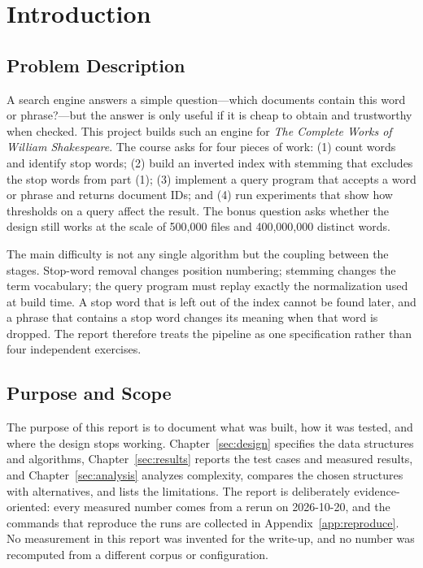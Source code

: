 
\section{Introduction}
\label{sec:intro}

\subsection{Problem Description}

A search engine answers a simple question---which documents contain this word
or phrase?---but the answer is only useful if it is cheap to obtain and
trustworthy when checked. This project builds such an engine for \emph{The
Complete Works of William Shakespeare}. The course asks for four pieces of
work: (1) count words and identify stop words; (2) build an inverted index with
stemming that excludes the stop words from part (1); (3) implement a query
program that accepts a word or phrase and returns document IDs; and (4) run
experiments that show how thresholds on a query affect the result. The bonus
question asks whether the design still works at the scale of 500,000 files and
400,000,000 distinct words.

The main difficulty is not any single algorithm but the coupling between the
stages. Stop-word removal changes position numbering; stemming changes the term
vocabulary; the query program must replay exactly the normalization used at
build time. A stop word that is left out of the index cannot be found later,
and a phrase that contains a stop word changes its meaning when that word is
dropped. The report therefore treats the pipeline as one specification rather
than four independent exercises.

\subsection{Purpose and Scope}

The purpose of this report is to document what was built, how it was tested,
and where the design stops working. Chapter~\ref{sec:design} specifies the
data structures and algorithms, Chapter~\ref{sec:results} reports the test
cases and measured results, and Chapter~\ref{sec:analysis} analyzes complexity,
compares the chosen structures with alternatives, and lists the limitations.
The report is deliberately evidence-oriented: every measured number comes from
a rerun on 2026-10-20, and the commands that reproduce the runs are collected
in Appendix~\ref{app:reproduce}. No measurement in this report was invented for
the write-up, and no number was recomputed from a different corpus or
configuration.


